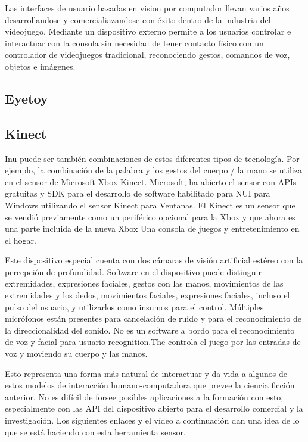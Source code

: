 Las interfaces de usuario basadas en vision por computador llevan varios años desarrollandose y comercialiazandose con éxito dentro de la industria del videojuego. Mediante un dispositivo externo permite a los usuarios controlar e interactuar con la consola sin necesidad de tener contacto físico con un controlador de videojuegos tradicional, reconociendo gestos, comandos de voz, objetos e imágenes.



\subsection{Eyetoy}
\subsection{Kinect}
Inu puede ser también combinaciones de estos diferentes tipos de tecnología. Por ejemplo, la combinación de la palabra y los gestos del cuerpo / la mano se utiliza en el sensor de Microsoft Xbox Kinect. Microsoft, ha abierto el sensor con APIs gratuitas y SDK para el desarrollo de software habilitado para NUI para Windows utilizando el sensor Kinect para Ventanas. El Kinect es un sensor que se vendió previamente como un periférico opcional para la Xbox y que ahora es una parte incluida de la nueva Xbox Una consola de juegos y entretenimiento en el hogar.

Este dispositivo especial cuenta con dos cámaras de visión artificial estéreo con la percepción de profundidad. Software en el dispositivo puede distinguir extremidades, expresiones faciales, gestos con las manos, movimientos de las extremidades y los dedos, movimientos faciales, expresiones faciales, incluso el pulso del usuario, y utilizarlos como insumos para el control. Múltiples micrófonos están presentes para cancelación de ruido y para el reconocimiento de la direccionalidad del sonido. No es un software a bordo para el reconocimiento de voz y facial para usuario recognition.The controla el juego por las entradas de voz y moviendo su cuerpo y las manos.

Esto representa una forma más natural de interactuar y da vida a algunos de estos modelos de interacción humano-computadora que prevee la ciencia ficción anterior. No es difícil de forsee posibles aplicaciones a la formación con esto, especialmente con las API del dispositivo abierto para el desarrollo comercial y la investigación. Los siguientes enlaces y el vídeo a continuación dan una idea de lo que se está haciendo con esta herramienta sensor.

